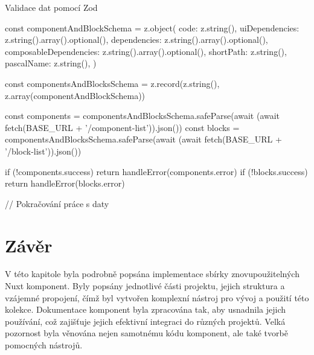 \begin{listing}[H]
    \caption{Validace dat pomocí Zod}
    \label{lst:cli-install}
    \begin{code}
const componentAndBlockSchema = z.object({
  code: z.string(),
  uiDependencies: z.string().array().optional(),
  dependencies: z.string().array().optional(),
  composableDependencies: z.string().array().optional(),
  shortPath: z.string(),
  pascalName: z.string(),
})

const componentsAndBlocksSchema = z.record(z.string(), z.array(componentAndBlockSchema))

const components = componentsAndBlocksSchema.safeParse(await (await fetch(BASE_URL + '/component-list')).json())
const blocks = componentsAndBlocksSchema.safeParse(await (await fetch(BASE_URL + '/block-list')).json())

if (!components.success) {
    return handleError(components.error)
}
if (!blocks.success) {
    return handleError(blocks.error)
}

// Pokračování práce s daty
\end{code}
\end{listing}

\section{Závěr}
V této kapitole byla podrobně popsána implementace sbírky znovupoužitelných Nuxt komponent. Byly popsány jednotlivé části projektu, jejich struktura a vzájemné propojení, čímž byl vytvořen komplexní nástroj pro vývoj a použití této kolekce. Dokumentace komponent byla zpracována tak, aby usnadnila jejich používání, což zajišťuje jejich efektivní integraci do různých projektů. Velká pozornost byla věnována nejen samotnému kódu komponent, ale také tvorbě pomocných nástrojů.